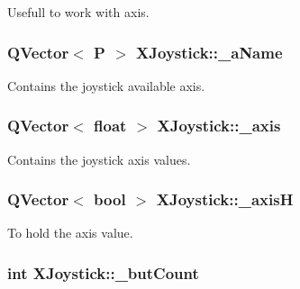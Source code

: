 Usefull to work with axis. 

\hypertarget{class_x_joystick_a9691db53f781029df614e6e7268f6600}{}
\subsubsection[{\+\_\+a\+Name}]{\setlength{\rightskip}{0pt plus 5cm}Q\+Vector$<$ {\bf P} $>$ X\+Joystick\+::\+\_\+a\+Name\hspace{0.3cm}{\ttfamily [private]}}\label{class_x_joystick_a9691db53f781029df614e6e7268f6600}


Contains the joystick available axis. 

\hypertarget{class_x_joystick_aa81258bbab92ce6946d0f25e6da521a7}{}
\subsubsection[{\+\_\+axis}]{\setlength{\rightskip}{0pt plus 5cm}Q\+Vector$<$ float $>$ X\+Joystick\+::\+\_\+axis\hspace{0.3cm}{\ttfamily [private]}}\label{class_x_joystick_aa81258bbab92ce6946d0f25e6da521a7}


Contains the joystick axis values. 

\hypertarget{class_x_joystick_a98105f2ba9654c2d1fd42b58fb689533}{}
\subsubsection[{\+\_\+axis\+H}]{\setlength{\rightskip}{0pt plus 5cm}Q\+Vector$<$ bool $>$ X\+Joystick\+::\+\_\+axis\+H\hspace{0.3cm}{\ttfamily [private]}}\label{class_x_joystick_a98105f2ba9654c2d1fd42b58fb689533}


To hold the axis value. 

\hypertarget{class_x_joystick_abaa9a13b0d15f4d457cb1a0cb8d1c257}{}
\subsubsection[{\+\_\+but\+Count}]{\setlength{\rightskip}{0pt plus 5cm}int X\+Joystick\+::\+\_\+but\+Count\hspace{0.3cm}{\ttfamily [private]}}\label{class_x_joystick_abaa9a13b0d15f4d457cb1a0cb8d1c257}


